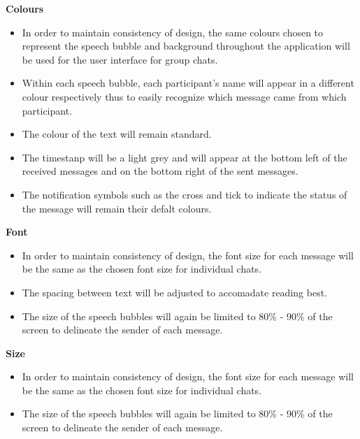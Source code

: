 \documentclass[11pt]{article}
\begin{document}
\textbf{Colours}\\
\begin{itemize}
\item	In order to maintain consistency of design, the same colours chosen to represent the speech bubble and background throughout the application will be used for the user interface for group chats.
\item	Within each speech bubble, each participant’s name will appear in a different colour respectively thus to easily recognize which message came from which participant.
\item	The colour of the text will remain standard.
\item The timestanp will be a light grey and will appear at the bottom left of the received  messages and on the bottom right of the sent messages.
\item The notification symbols such as the cross and tick to indicate the status of the message will remain their defalt colours.\\
\end{itemize}

\textbf{Font}\\
\begin{itemize}
\item	In order to maintain consistency of design, the font size for each message will be the same as the chosen font size for individual chats.
\item The spacing between text will be adjusted to accomadate reading best.
\item	The size of the speech bubbles will again be limited to 80\% - 90\% of the screen to delineate the sender of each message. \\
\end{itemize}

\textbf{Size}\\
\begin{itemize}
\item	In order to maintain consistency of design, the font size for each message will be the same as the chosen font size for individual chats.
\item	The size of the speech bubbles will again be limited to 80\% - 90\% of the screen to delineate the sender of each message. \\
\end{itemize}
\end{document}
